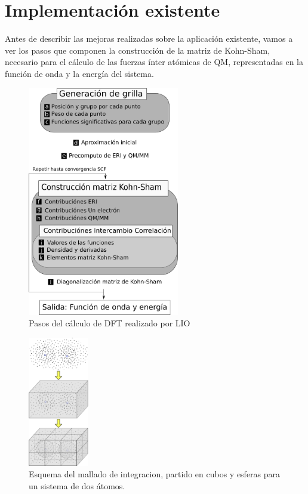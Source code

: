 \section{Implementaci\'on existente}
Antes de describir las mejoras realizadas sobre la aplicaci\'on existente, vamos a ver
los pasos que componen la construcci\'on de la matriz de Kohn-Sham, necesario para el
c\'alculo de las fuerzas \'inter at\'omicas de QM, representadas en la funci\'on de onda y
la energ\'ia del sistema.

\begin{figure}[htbp]
   \centering
   \includegraphics[width=250px]{images/g2g-steps.pdf}
   \caption{Pasos del c\'alculo de DFT realizado por LIO}
   \label{fig:lio-steps}
\end{figure}

\begin{figure}[htbp]
   \centering
   \includegraphics[width=100px]{images/grilla.pdf}
   \caption{Esquema del mallado de integracion, partido en cubos y esferas para un sistema de dos \'atomos.}
   \label{fig:grilla}
\end{figure}

